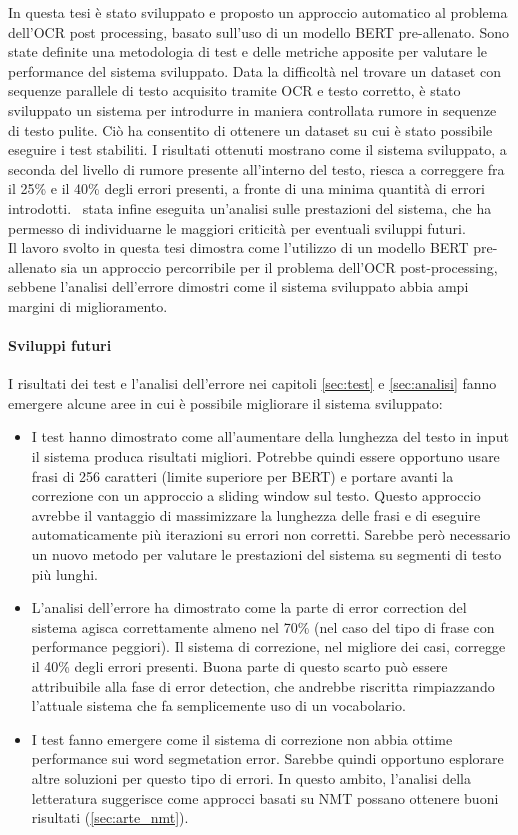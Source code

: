 In questa tesi è stato sviluppato e proposto un approccio automatico al problema dell'OCR post processing, basato sull'uso di un modello BERT pre-allenato. Sono state definite una metodologia di test e delle metriche apposite per valutare le performance del sistema sviluppato. Data la difficoltà nel trovare un dataset con sequenze parallele di testo acquisito tramite OCR e testo corretto, è stato sviluppato un sistema per introdurre in maniera controllata rumore in sequenze di testo pulite. Ciò ha consentito di ottenere un dataset su cui è stato possibile eseguire i test stabiliti. I risultati ottenuti mostrano come il sistema sviluppato, a seconda del livello di rumore presente all'interno del testo, riesca a correggere fra il 25\% e il 40\% degli errori presenti, a fronte di una minima quantità di errori introdotti. \E\ stata infine eseguita un'analisi sulle prestazioni del sistema, che ha permesso di individuarne le maggiori criticità per eventuali sviluppi futuri.\\
Il lavoro svolto in questa tesi dimostra come l'utilizzo di un modello BERT pre-allenato sia un approccio percorribile per il problema dell'OCR post-processing, sebbene l'analisi dell'errore dimostri come il sistema sviluppato abbia ampi margini di miglioramento.

\paragraph{Sviluppi futuri} I risultati dei test e l'analisi dell'errore nei capitoli \ref{sec:test} e \ref{sec:analisi} fanno emergere alcune aree in cui è possibile migliorare il sistema sviluppato:

\begin{itemize}
\item I test hanno dimostrato come all'aumentare della lunghezza del testo in input il sistema produca risultati migliori. Potrebbe quindi essere opportuno usare frasi di 256 caratteri (limite superiore per BERT) e portare avanti la correzione con un approccio a sliding window sul testo. Questo approccio avrebbe il vantaggio di massimizzare la lunghezza delle frasi e di eseguire automaticamente più iterazioni su errori non corretti. Sarebbe però necessario un nuovo metodo per valutare le prestazioni del sistema su segmenti di testo più lunghi.

\item L'analisi dell'errore ha dimostrato come la parte di error correction del sistema agisca correttamente almeno nel 70\% (nel caso del tipo di frase con performance peggiori). Il sistema di correzione, nel migliore dei casi, corregge il 40\% degli errori presenti. Buona parte di questo scarto può essere attribuibile alla fase di error detection, che andrebbe riscritta rimpiazzando l'attuale sistema che fa semplicemente uso di un vocabolario.

\item I test fanno emergere come il sistema di correzione non abbia ottime performance sui word segmetation error. Sarebbe quindi opportuno esplorare altre soluzioni per questo tipo di errori. In questo ambito, l'analisi della letteratura suggerisce come approcci basati su NMT possano ottenere buoni risultati (\autoref{sec:arte_nmt}).
\end{itemize}